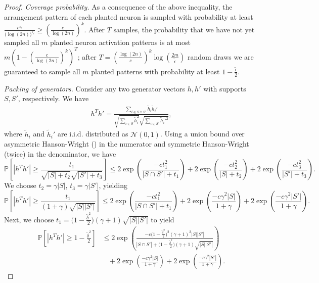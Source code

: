 \documentclass{article} %
\newcommand{\n}{\ensuremath{n}}
\newcommand{\m}{\ensuremath{m}}
\newcommand{\Prob}{\ensuremath{{\mathbb{P}}}}
\newcommand{\1}{\ensuremath{{\sf (i)}}}
\newcommand{\2}{\ensuremath{{\sf (ii)}}}
\newcommand{\3}{\ensuremath{{\sf (iii)}}}
\newcommand{\4}{\ensuremath{{\sf (iv)}}}
\newcommand{\5}{\ensuremath{{\sf (v)}}}
\newcommand{\6}{\ensuremath{{\sf (vi)}}}
\begin{document}
\begin{proof}
\textit{Coverage probability.} 
As a consequence of the above inequality, the arrangement pattern of each planted neuron is sampled with probability at least $\frac{c^{s_i}}{\bigl(\log(2\n)\bigr)^{s_i}} \geq \left( \frac{c}{\log(2\n)} \right)^k$. 
After $T$ samples, the probability that we have not yet sampled all $\m$ planted neuron activation patterns is at most $\m\left(1-\left( \frac{c}{\log(2\n)} \right)^k\right)^T$; after $T = \left( \frac{\log(2\n)}{c} \right)^k \log\left(\frac{2\m}{\tilde\epsilon} \right)$ random draws we are guaranteed to sample all $\m$ planted patterns with probability at least $1-\frac{\tilde\epsilon}{2}$.




\textit{Packing of generators.}
Consider any two generator vectors $h, h'$ with supports $S, S'$, respectively. We have
\begin{align*}
    h^Th' = \frac{\sum_{i\in S\cap S'} \tilde h_i\tilde h_i'}{\sqrt{\sum_{i\in S}\tilde h_i^2} \sqrt{\sum_{i\in S'}\tilde h_i'^2}} ,
\end{align*}
where $\tilde h_i$ and $\tilde h_i'$ are i.i.d. distributed as $\mathcal{N}(0,1)$.
Using a union bound over asymmetric Hanson-Wright () in the numerator and symmetric Hanson-Wright (twice) in the denominator, we have
{
\small
\begin{equation*}
    \Prob\left[|h^Th'| \geq \frac{t_1}{\sqrt{|S|+t_2} \sqrt{|S'| + t_3}}\right] \leq 2\exp\left(\frac{-ct_1^2}{|S\cap S'|+t_1} \right) + 2\exp\left(\frac{-ct_2^2}{|S|+t_2} \right) + 2\exp\left(\frac{-ct_3^2}{|S'|+t_3} \right) .
\end{equation*}
}
We choose $t_2 = \gamma|S|$, $t_3 = \gamma|S'|$, yielding
{ \small
\begin{equation*}
    \Prob\left[|h^Th'| \geq \frac{t_1}{(1+\gamma)\sqrt{|S||S'|} }\right] \leq 2\exp\left(\frac{-ct_1^2}{|S\cap S'|+t_1} \right) + 2\exp\left(\frac{-c\gamma^2|S|}{1+\gamma} \right) + 2\exp\left(\frac{-c\gamma^2|S'|}{1+\gamma} \right) .
\end{equation*}
}
Next, we choose $t_1 = \big(1-\frac{\tilde\delta^2}{2}\big)(\gamma+1)\sqrt{|S||S'|}$ to yield
\begin{align*}
    \Prob\left[|h^Th'| \geq 1-\frac{\tilde\delta^2}{2}\right] &\leq 2\exp\left(\frac{-c \big(1-\frac{\tilde\delta^2}{2}\big)^2(\gamma+1)^2|S||S'|}{|S\cap S'|+\big(1-\frac{\tilde\delta^2}{2}\big)(\gamma+1)\sqrt{|S||S'|}} \right) \\
    &~~~~ + 2\exp\left(\frac{-c\gamma^2|S|}{1+\gamma} \right) + 2\exp\left(\frac{-c\gamma^2|S'|}{1+\gamma} \right) .

\end{align*}
\end{proof}
\end{document}
